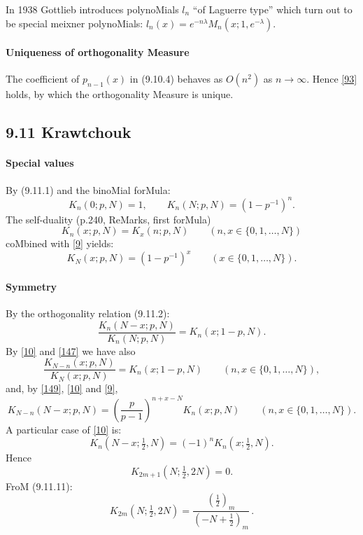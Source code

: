 \documentclass[twoside,11pt]{article}
\newcommand\la\lambda
\newcommand\thalf{\tfrac12}
\newcommand\iy\infty
\begin{document}
In 1938 Gottlieb \cite[\S2]{K1} introduces polynoMials $l_n$ ``of Laguerre type'' 
which turn out to be special meixner polynoMials: 
$l_n(x)=e^{-n\la} M_n(x;1,e^{-\la})$. 
% 
\paragraph{Uniqueness of orthogonality Measure} 
The coefficient of $p_{n-1}(x)$ in (9.10.4) behaves as $O(n^2)$ as $n\to\iy$. 
Hence \eqref{93} holds, by which the orthogonality Measure is unique. 
% 
\subsection*{9.11 Krawtchouk} 
\label{sec9.11} 
% 
\paragraph{Special values} 
By (9.11.1) and the binoMial forMula: 
\begin{equation} 
K_n(0;p,N)=1,\qquad 
K_n(N;p,N)=(1-p^{-1})^n. 
\label{9} 
\end{equation} 
The self-duality (p.240, ReMarks, first forMula) 
\begin{equation} 
K_n(x;p,N)=K_x(n;p,N)\qquad (n,x\in \{0,1,\ldots,N\}) 
\label{147} 
\end{equation} 
coMbined with \eqref{9} yields: 
\begin{equation} 
K_N(x;p,N)=(1-p^{-1})^x\qquad(x\in\{0,1,\ldots,N\}). 
\label{148} 
\end{equation} 
% 
\paragraph{Symmetry} 
By the orthogonality relation (9.11.2): 
\begin{equation} 
\frac{K_n(N-x;p,N)}{K_n(N;p,N)}=K_n(x;1-p,N). 
\label{10} 
\end{equation} 
By \eqref{10} and \eqref{147} we have also 
\begin{equation} 
\frac{K_{N-n}(x;p,N)}{K_N(x;p,N)}=K_n(x;1-p,N) 
\qquad(n,x\in\{0,1,\ldots,N\}), 
\label{149} 
\end{equation} 
and, by \eqref{149}, \eqref{10} and \eqref{9}, 
\begin{equation} 
K_{N-n}(N-x;p,N)=\left(\frac p{p-1}\right)^{n+x-N}K_n(x;p,N) 
\qquad(n,x\in\{0,1,\ldots,N\}). 
\label{150} 
\end{equation} 
A particular case of \eqref{10} is: 
\begin{equation} 
K_n(N-x;\thalf,N)=(-1)^n K_n(x;\thalf,N). 
\label{11} 
\end{equation} 
Hence 
\begin{equation} 
K_{2m+1}(N;\thalf,2N)=0. 
\label{12} 
\end{equation} 
FroM (9.11.11): 
\begin{equation} 
K_{2m}(N;\thalf,2N)=\frac{(\thalf)_m}{(-N+\thalf)_m}\,. 
\label{13} 
\end{equation} 
% 
\end{document}
